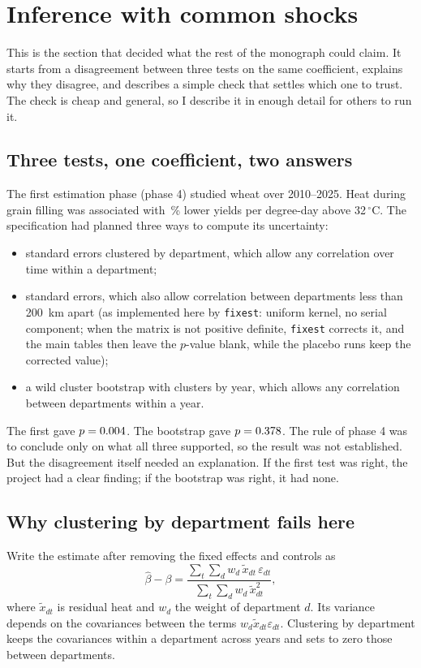 \section{Inference with common shocks}
\label{sec:inference}

This is the section that decided what the rest of the monograph could claim. It starts from a disagreement between three tests on the same coefficient, explains why they disagree, and describes a simple check that settles which one to trust. The check is cheap and general, so I describe it in enough detail for others to run it.

\subsection{Three tests, one coefficient, two answers}

The first estimation phase (phase 4) studied wheat over 2010--2025. Heat during grain filling was associated with \WheatPct\,\% lower yields per degree-day above 32\,$^{\circ}$C. The specification had planned three ways to compute its uncertainty:
\begin{itemize}
  \item standard errors clustered by department, which allow any correlation over time within a department;
  \item \textcite{conley1999} standard errors, which also allow correlation between departments less than 200~km apart (as implemented here by \texttt{fixest}: uniform kernel, no serial component; when the matrix is not positive definite, \texttt{fixest} corrects it, and the main tables then leave the $p$-value blank, while the placebo runs keep the corrected value);
  \item a wild cluster bootstrap with clusters by year, which allows any correlation between departments within a year.
\end{itemize}
The first gave $p = 0.004$. The bootstrap gave $p = 0.378$. The rule of phase 4 was to conclude only on what all three supported, so the result was not established. But the disagreement itself needed an explanation. If the first test was right, the project had a clear finding; if the bootstrap was right, it had none.

\subsection{Why clustering by department fails here}

Write the estimate after removing the fixed effects and controls as
\begin{equation}
\hat\beta - \beta = \frac{\sum_{t}\sum_{d} w_d\, \tilde x_{dt}\, \varepsilon_{dt}}{\sum_t \sum_d w_d\, \tilde x_{dt}^2},
\end{equation}
where $\tilde x_{dt}$ is residual heat and $w_d$ the weight of department $d$. Its variance depends on the covariances between the terms $w_d\tilde x_{dt}\varepsilon_{dt}$. Clustering by department keeps the covariances within a department across years and sets to zero those between departments.

